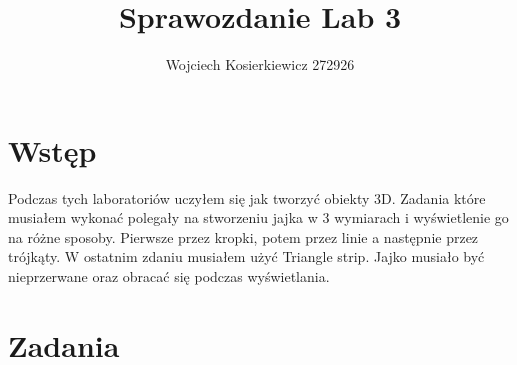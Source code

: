 \documentclass[]{article}
\title{Sprawozdanie Lab 3}
\author{Wojciech Kosierkiewicz 272926}
\begin{document}
	\maketitle
	\newpage
	
\section{Wstęp}
Podczas tych laboratoriów uczyłem się jak tworzyć obiekty 3D. Zadania które musiałem wykonać polegały na stworzeniu jajka w 3 wymiarach i wyświetlenie go na różne sposoby. Pierwsze przez kropki, potem przez linie a następnie przez trójkąty. W ostatnim zdaniu musiałem użyć Triangle strip. Jajko musiało być nieprzerwane oraz obracać się podczas wyświetlania.
\section{Zadania}
\end{document}
